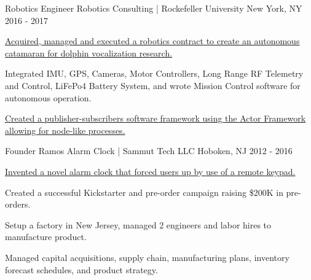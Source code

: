 \begin{cventries}
  \cventry
    {Robotics Engineer} %
    {Robotics Consulting | Rockefeller University} %
    {New York, NY} %
    {2016 - 2017} %
    {
      \begin{cvitems} %
        \item {\href{http://bit.ly/2Tg8zKO}
            {Acquired, managed and executed a robotics contract to create an autonomous catamaran for dolphin vocalization research.}}
        \item {Integrated IMU, GPS, Cameras, Motor Controllers, Long Range RF Telemetry and Control, 
                    LiFePo4 Battery System, and wrote Mission Control software for autonomous operation.}
        \item {\href{http://bit.ly/2BSBD1c}{Created a publisher-subscribers software framework using the Actor Framework allowing for node-like processes.}}
      \end{cvitems}
    }

  \cventry
    {Founder} %
    {Ramos Alarm Clock | Sammut Tech LLC} %
    {Hoboken, NJ} %
    {2012 - 2016} %
    {
      \begin{cvitems} %
        \item {\href{http://bit.ly/2NvLgHA}{Invented a novel alarm clock that forced users up by use of a remote keypad.}}
        \item {Created a successful Kickstarter and pre-order campaign raising \$200K in pre-orders.}
        \item {Setup a factory in New Jersey, managed 2 engineers and labor hires to manufacture product.}
        \item {Managed capital acquisitions, supply chain, manufacturing plans, inventory forecast schedules, and product strategy.}
      \end{cvitems}
    }


\end{cventries}
